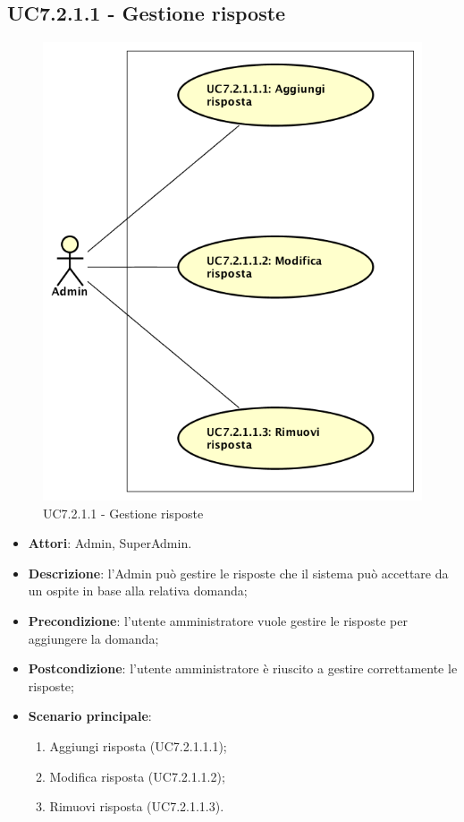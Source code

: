 \documentclass[../AnalisiDeiRequisiti_v3.0.0.tex]{subfiles}
\begin{document}
\begin{itemize}
\subsection{UC7.2.1.1 - Gestione risposte} 
\label{sssec:UC7.2.1.1} 
\begin{figure}[!h]
	\centering
	\includegraphics[scale=0.7]{UseCases/UC7_GestionePannelloAdmin/UC7_2_GestioneDomande/UC7_2_1_AggiungiDomanda/UC7_2_1_1_GestioneRisposte/UC7_2_1_1_GestioneRisposte.png}
	\caption{UC7.2.1.1 - Gestione risposte}
\end{figure}
\begin{itemize} 
\item \textbf{Attori}: Admin, SuperAdmin.
\item \textbf{Descrizione}: l'Admin può gestire le risposte che il sistema può accettare da un ospite in base alla relativa domanda;
\item \textbf{Precondizione}: l'utente amministratore vuole gestire le risposte per aggiungere la domanda;
\item \textbf{Postcondizione}: l'utente amministratore è riuscito a gestire correttamente le risposte;
\item \textbf{Scenario principale}: \begin{enumerate}\item Aggiungi risposta (UC7.2.1.1.1);\item Modifica risposta (UC7.2.1.1.2);\item Rimuovi risposta (UC7.2.1.1.3).
 \end{enumerate}
\end{itemize}  
\newpage

\end{itemize}
\end{document}
